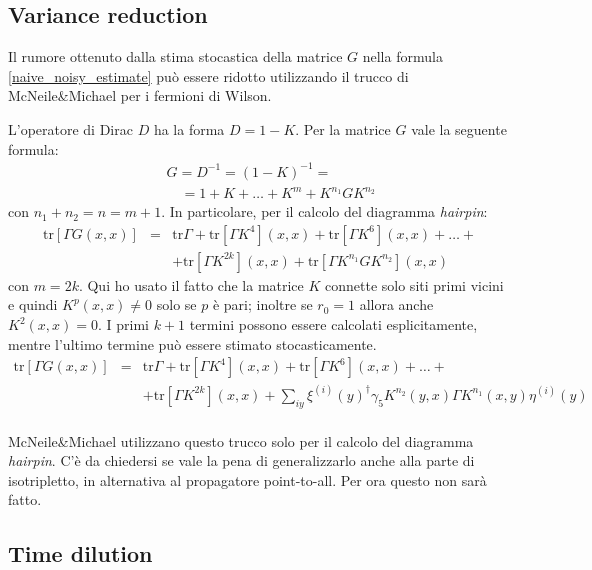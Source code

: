 \documentclass[a4paper]{article}
\newcommand{\tr}{\mathrm{tr}}
\begin{document}
\subsection{Variance reduction}

Il rumore ottenuto dalla stima stocastica della matrice $G$ nella formula \ref{naive_noisy_estimate} pu\`{o} essere ridotto utilizzando il trucco di McNeile\&Michael \cite{McNeile:2000xx} per i fermioni di Wilson.

L'operatore di Dirac $D$ ha la forma $ D = 1 - K $. Per la matrice $G$ vale la seguente formula:
\begin{eqnarray*}
&& G = D^{-1} = \left( 1 - K \right)^{-1} = \\
&& \quad = 1 + K + \dots + K^m + K^{n_1} G K^{n_2}
\end{eqnarray*}
con $ n_1 + n_2 = n = m+1 $. In particolare, per il calcolo del diagramma \textit{hairpin}:
\begin{eqnarray*}
\tr \left[ \Gamma G(x,x) \right] &=& \tr \Gamma + \tr \left[ \Gamma K^4 \right](x,x) + \tr \left[ \Gamma K^6 \right](x,x) + \dots + \\
&& + \tr \left[ \Gamma K^{2k} \right](x,x) + \tr \left[ \Gamma K^{n_1} G K^{n_2} \right](x,x)
\end{eqnarray*}
con $m = 2k$. Qui ho usato il fatto che la matrice $K$ connette solo siti primi vicini e quindi $ K^p(x,x) \neq 0 $ solo se $p$ \`{e} pari; inoltre se $r_0=1$ allora anche $ K^2(x,x) = 0 $. I primi $k+1$ termini possono essere calcolati esplicitamente, mentre l'ultimo termine pu\`{o} essere stimato stocasticamente.
\begin{eqnarray}
\tr \left[ \Gamma G(x,x) \right] &=& \tr \Gamma + \tr \left[ \Gamma K^4 \right](x,x) + \tr \left[ \Gamma K^6 \right](x,x) + \dots + \nonumber \\
&& + \tr \left[ \Gamma K^{2k} \right](x,x) + \sum_{iy} \xi^{(i)}(y)^\dagger \gamma_5 K^{n_2}(y,x) \Gamma K^{n_1}(x,y) \eta^{(i)}(y) \nonumber \\
&& \label{hairpin_with_variance_reduction}
\end{eqnarray}

McNeile\&Michael utilizzano questo trucco solo per il calcolo del diagramma \textit{hairpin}. C'\`{e} da chiedersi se vale la pena di generalizzarlo anche alla parte di isotripletto, in alternativa al propagatore point-to-all. Per ora questo non sar\`{a} fatto.



\subsection{Time dilution}
\end{document}
